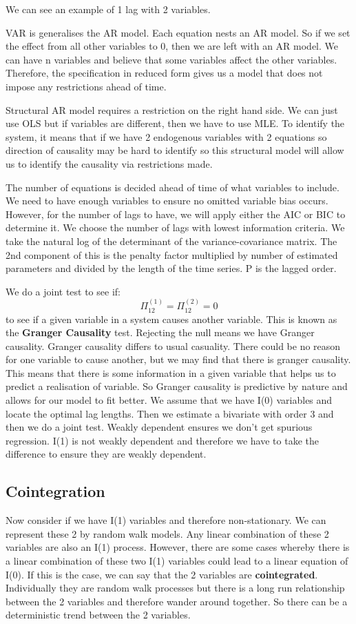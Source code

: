 \documentclass[11pt, oneside]{article}
\theoremstyle{definition}
\begin{document}
We can see an example of 1 lag with 2 variables.

VAR is generalises the AR model. Each equation nests an AR model. So if we set the effect from all other variables to 0, then we are left with an AR model. We can have n variables and believe that some variables affect the other variables. Therefore, the specification in reduced form gives us a model that does not impose any restrictions ahead of time.

Structural AR model requires a restriction on the right hand side. We can just use OLS but if variables are different, then we have to use MLE. To identify the system, it means that if we have 2 endogenous variables with 2 equations so direction of causality may be hard to identify so this structural model will allow us to identify the causality via restrictions made.

The number of equations is decided ahead of time of what variables to include. We need to have enough variables to ensure no omitted variable bias occurs. However, for the number of lags to have, we will apply either the AIC or BIC to determine it. We choose the number of lags with lowest information criteria. We take the natural log of the determinant of the variance-covariance matrix. The 2nd component of this is the penalty factor multiplied by number of estimated parameters and divided by the length of the time series. P is the lagged order.

We do a joint test to see if:
$$
\Pi_{12}^{(1)} = \Pi_{12}^{(2)} = 0
$$
to see if a given variable in a system causes another variable. This is known as the \textbf{Granger Causality} test. Rejecting the null means we have Granger causality. Granger causality differs to usual casuality. There could be no reason for one variable to cause another, but we may find that there is granger causality. This means that there is some information in a given variable that helps us to predict a realisation of variable. So Granger causality is predictive by nature and allows for our model to fit better. We assume that we have I(0) variables and locate the optimal lag lengths. Then we estimate a bivariate with order 3 and then we do a joint test. Weakly dependent ensures we don't get spurious regression. I(1) is not weakly dependent and therefore we have to take the difference to ensure they are weakly dependent.

\subsection{Cointegration}
Now consider if we have I(1) variables and therefore non-stationary. We can represent these 2 by random walk models. Any linear combination of these 2 variables are also an I(1) process. However, there are some cases whereby there is a linear combination of these two I(1) variables could lead to a linear equation of I(0). If this is the case, we can say that the 2 variables are \textbf{cointegrated}. Individually they are random walk processes but there is a long run relationship between the 2 variables and therefore wander around together. So there can be a deterministic trend between the 2 variables.
\end{document}
